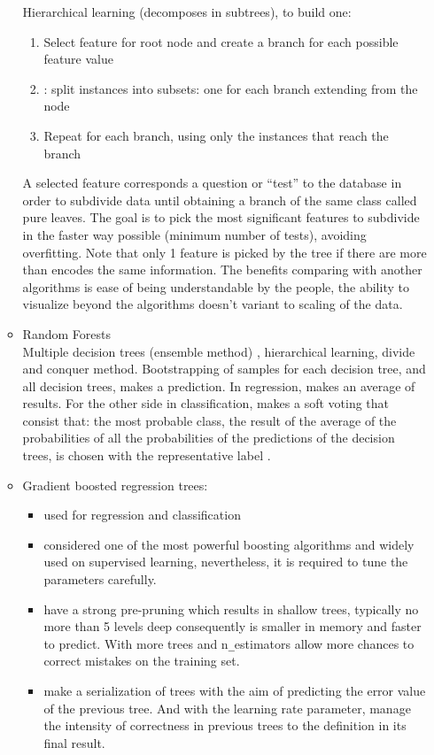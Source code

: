 \begin{itemize}
\begin{itemize}
 Hierarchical learning (decomposes in subtrees),
to build one:
\begin{enumerate}
\item Select feature for root node and create a branch for each possible feature value
\item: split instances into subsets: one for each branch extending from the node
\item Repeat for each branch, using only the instances that reach the branch
\end{enumerate}
A selected feature corresponds a question or 
“test” to the database in order to subdivide data until obtaining a branch of the same class called pure leaves.
The goal is to pick the most significant features to subdivide in the faster way possible (minimum number of tests), avoiding overfitting. Note that only 1 feature is picked by the tree if there are more than encodes the same information. The benefits comparing with another algorithms is ease of being understandable by the people, the ability to visualize beyond the algorithms doesn't variant to scaling of the data.
\item Random Forests\\  
Multiple decision trees (ensemble method)  , hierarchical learning, divide and conquer method.
Bootstrapping of samples for each decision tree, and all decision trees, makes a prediction. In regression, makes an average of results. For the other side in classification, makes a soft voting that consist that:
the most probable class, the result of the average of the probabilities of all the probabilities of the predictions of the decision trees, is chosen with the representative label \cite{Muller2017}.
\item Gradient boosted regression trees:
\begin{itemize}
\item used for regression and classification
\item considered one of the most powerful boosting algorithms and widely used on supervised learning, nevertheless, it is required to tune the parameters carefully. 
\item  have a strong pre-pruning which results in shallow trees, typically no more than 5 levels deep consequently is smaller in memory and faster to predict. With more trees and n\texttt{\_}estimators allow more chances to correct mistakes on the training set. 
\item make a serialization of trees with the aim of predicting the error value of the previous tree. And with the learning rate parameter, manage the intensity of correctness in previous trees to the definition in its final result.
\end{itemize}

 \end{itemize}
\end{itemize}

